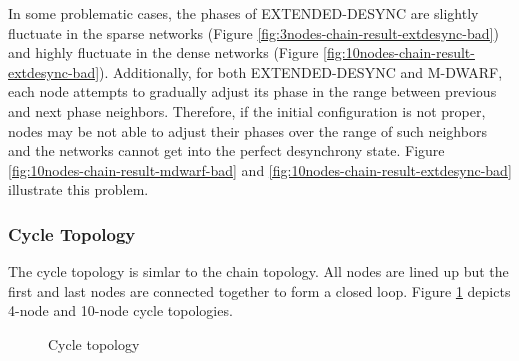 In some problematic cases, the phases of EXTENDED-DESYNC are slightly fluctuate in the sparse networks (Figure \ref{fig:3nodes-chain-result-extdesync-bad}) and highly fluctuate in the dense networks (Figure \ref{fig:10nodes-chain-result-extdesync-bad}). Additionally, for both EXTENDED-DESYNC and M-DWARF, each node attempts to gradually adjust its phase in the range between previous and next phase neighbors. Therefore, if the initial configuration is not proper, nodes may be not able to adjust their phases over the range of such neighbors and the networks cannot get into the perfect desynchrony state. Figure \ref{fig:10nodes-chain-result-mdwarf-bad} and \ref{fig:10nodes-chain-result-extdesync-bad} illustrate this problem.

\subsubsection{Cycle Topology}
The cycle topology is simlar to the chain topology. All nodes are lined up but the first and last nodes are connected together to form a closed loop. Figure \ref{fig:cycle-eval} depicts 4-node and 10-node cycle topologies.
\begin{figure}[!t]
\caption{Cycle topology}
\label{fig:cycle-eval}
\lofcont
\end{figure}


